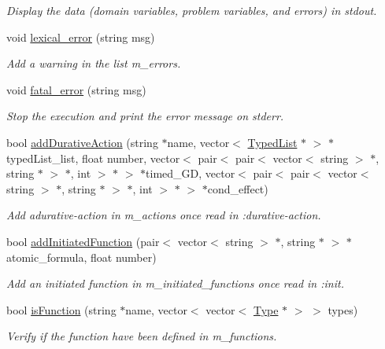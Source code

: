 \begin{DoxyCompactItemize}
\begin{DoxyCompactList}\small\item\em Display the data (domain variables, problem variables, and errors) in stdout. \end{DoxyCompactList}\item 
void \hyperlink{classData_ac0f3cb4edd016d70b6e1510c7d5be6eb}{lexical\+\_\+error} (string msg)
\begin{DoxyCompactList}\small\item\em Add a warning in the list m\+\_\+errors. \end{DoxyCompactList}\item 
void \hyperlink{classData_aabe4046094f2f22776988fe24a174065}{fatal\+\_\+error} (string msg)
\begin{DoxyCompactList}\small\item\em Stop the execution and print the error message on stderr. \end{DoxyCompactList}\item 
bool \hyperlink{classData_a9683ed950f2f4417f52abdfead47224c}{add\+Durative\+Action} (string $\ast$name, vector$<$ \hyperlink{classTypedList}{Typed\+List} $\ast$ $>$ $\ast$typed\+List\+\_\+list, float number, vector$<$ pair$<$ pair$<$ vector$<$ string $>$ $\ast$, string $\ast$ $>$ $\ast$, int $>$ $\ast$ $>$ $\ast$timed\+\_\+\+G\+D, vector$<$ pair$<$ pair$<$ vector$<$ string $>$ $\ast$, string $\ast$ $>$ $\ast$, int $>$ $\ast$ $>$ $\ast$cond\+\_\+effect)
\begin{DoxyCompactList}\small\item\em Add adurative-\/action in m\+\_\+actions once read in \+:durative-\/action. \end{DoxyCompactList}\item 
bool \hyperlink{classData_a54b144fea33e662b4f2e461b9c741079}{add\+Initiated\+Function} (pair$<$ vector$<$ string $>$ $\ast$, string $\ast$ $>$ $\ast$atomic\+\_\+formula, float number)
\begin{DoxyCompactList}\small\item\em Add an initiated function in m\+\_\+initiated\+\_\+functions once read in \+:init. \end{DoxyCompactList}\item 
bool \hyperlink{classData_a81e53e623b3098f3caf6588ad2d08dc7}{is\+Function} (string $\ast$name, vector$<$ vector$<$ \hyperlink{classType}{Type} $\ast$ $>$ $>$ types)
\begin{DoxyCompactList}\small\item\em Verify if the function have been defined in m\+\_\+functions. \end{DoxyCompactList}\item 

\end{DoxyCompactItemize}
